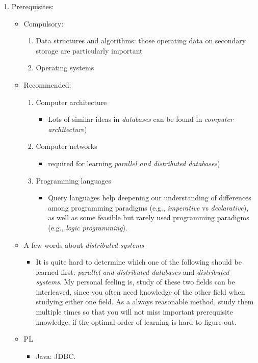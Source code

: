 \documentclass{article}
\begin{document}
\begin{enumerate}
    \item Prerequisites:
    \begin{itemize}
        \item Compulsory:
        \begin{enumerate}
            \item Data structures and algorithms: those operating data on secondary storage are particularly important
            \item Operating systems
        \end{enumerate}
        \item Recommended:
        \begin{enumerate}
            \item Computer architecture
            \begin{itemize}
                \item Lots of similar ideas in \emph{databases} can be found in \emph{computer architecture})
            \end{itemize}
            \item Computer networks
            \begin{itemize}
                \item required for learning \emph{parallel and distributed databases})
            \end{itemize}
            \item Programming languages
            \begin{itemize}
                \item Query languages help deepening our understanding of differences among programming paradigms (e.g., \emph{imperative} vs \emph{declarative}), as well as some feasible but rarely used programming paradigms (e.g., \emph{logic programming}).
            \end{itemize}
        \end{enumerate}
        \item A few words about \emph{distributed systems}
        \begin{itemize}
            \item It is quite hard to determine which one of the following should be learned first: \emph{parallel and distributed databases} and \emph{distributed systems}.
            My personal feeling is, study of these two fields can be interleaved, since you often need knowledge of the other field when studying either one field.
            As a always reasonable method, study them multiple times so that you will not miss important prerequisite knowledge, if the optimal order of learning is hard to figure out.
        \end{itemize}
        \item PL
        \begin{itemize}
            \item Java: JDBC.
        \end{itemize}
    \end{itemize}
\end{enumerate}
\end{document}
